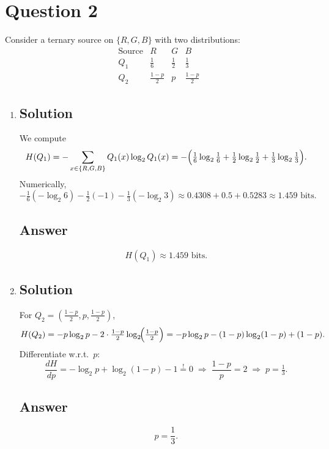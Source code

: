 \documentclass[12pt]{article}
\begin{document}
	
	\section*{Question 2}
	
	\noindent 
	
	\bigskip
	
	Consider a ternary source on $\{R,G,B\}$ with two distributions:
	\[
	\begin{array}{c|ccc}
		\text{Source} & R & G & B\\\hline
		Q_1 & \tfrac16 & \tfrac12 & \tfrac13\\
		Q_2 & \tfrac{1-p}2 & p & \tfrac{1-p}2
	\end{array}
	\]
	
	\begin{enumerate}[start=1,label={\bfseries Part \arabic*:},leftmargin=0in]
		\bigskip\item 
		
		\subsection*{Solution}
		We compute
		\[
		H(Q_1)
		=-\sum_{x\in\{R,G,B\}}Q_1(x)\log_2Q_1(x)
		=-\Bigl(\tfrac16\log_2\tfrac16+\tfrac12\log_2\tfrac12+\tfrac13\log_2\tfrac13\Bigr).
		\]
		Numerically,
		\[
		-\tfrac16(-\log_2 6)-\tfrac12(-1)-\tfrac13(-\log_2 3)
		\approx0.4308+0.5+0.5283
		\approx1.459\text{ bits}.
		\]
		
		\subsection*{Answer}
		\[
		\boxed{H(Q_1)\approx1.459\text{ bits}.}
		\]
		
		\bigskip\item 
		
		\subsection*{Solution}
		For $Q_2=(\tfrac{1-p}2,p,\tfrac{1-p}2)$,
		\[
		H(Q_2)
		=-p\log_2 p-2\cdot\tfrac{1-p}2\log_2\!\Bigl(\tfrac{1-p}2\Bigr)
		=-p\log_2 p-(1-p)\log_2(1-p)+(1-p).
		\]
		Differentiate w.r.t.\ $p$:
		\[
		\frac{dH}{dp}
		=-\log_2 p+\log_2(1-p)-1
		\stackrel{!}{=}0
		\;\Longrightarrow\;
		\frac{1-p}{p}=2
		\;\Longrightarrow\;p=\tfrac13.
		\]
		
		\subsection*{Answer}
		\[
		\boxed{p=\frac13.}
		\]
	\end{enumerate}
	
\end{document}
